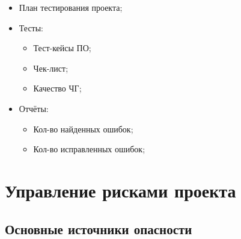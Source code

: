 \documentclass[a4paper,10pt]{article}
\begin{document}
        \begin{itemize}
            \item План тестирования проекта;
            \item Тесты:
                \begin{itemize}
                    \item Тест-кейсы ПО;
                    \item Чек-лист;
                    \item Качество ЧГ;
                \end{itemize}
            \item Отчёты:
                \begin{itemize}
                \item Кол-во найденных ошибок;
                \item Кол-во исправленных ошибок;
                \end{itemize}

        \end{itemize}

\section{Управление рисками проекта}

\subsection{Основные источники опасности}
\end{document}
